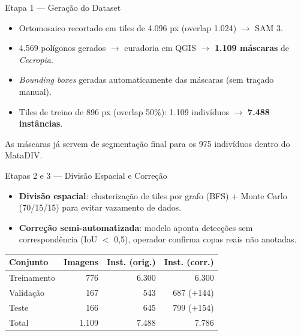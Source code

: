 \documentclass[aspectratio=169, 11pt]{beamer}
\begin{document}
\begin{frame}{Etapa 1 — Geração do Dataset}
    \begin{itemize}
        \item Ortomosaico recortado em tiles de 4.096 px (overlap 1.024) $\to$ SAM 3.
        \item 4.569 polígonos gerados $\to$ curadoria em QGIS $\to$ \textbf{1.109 máscaras} de \textit{Cecropia}.
        \item \textit{Bounding boxes} geradas automaticamente das máscaras (sem traçado manual).
        \item Tiles de treino de 896 px (overlap 50\%): 1.109 indivíduos $\to$ \textbf{7.488 instâncias}.
    \end{itemize}
    \vspace{0.4em}
    \small As máscaras já servem de segmentação final para os 975 indivíduos dentro do MataDIV.
\end{frame}

\begin{frame}{Etapas 2 e 3 — Divisão Espacial e Correção}
    \begin{itemize}
        \item \textbf{Divisão espacial}: clusterização de tiles por grafo (BFS) + Monte Carlo (70/15/15) para evitar vazamento de dados.
        \item \textbf{Correção semi-automatizada}: modelo aponta detecções sem correspondência (IoU $<$ 0,5), operador confirma copas reais não anotadas.
    \end{itemize}
    \begin{table}
        \centering
        \small
        \begin{tabular}{lrrr}
            \toprule
            \textbf{Conjunto} & \textbf{Imagens} & \textbf{Inst. (orig.)} & \textbf{Inst. (corr.)} \\
            \midrule
            Treinamento & 776   & 6.300 & 6.300 \\
            Validação   & 167   & 543   & 687 (+144) \\
            Teste       & 166   & 645   & 799 (+154) \\
            \midrule
            Total       & 1.109 & 7.488 & 7.786 \\
            \bottomrule
        \end{tabular}
    \end{table}
\end{frame}
\end{document}
